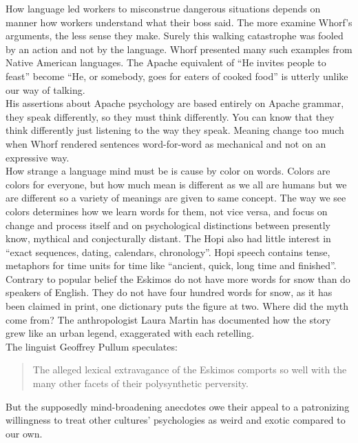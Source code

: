 \documentclass[13pt,letterpaper,onecolumn]{report}
\begin{document}
\hspace{1em}How language led workers to misconstrue dangerous situations depends on manner how workers understand what their boss said. The more examine Whorf’s arguments, the less sense they make. Surely this walking catastrophe was fooled by an action and not by the language. Whorf presented many such examples from Native American languages. The Apache equivalent of “He invites people to feast” become “He, or somebody, goes for eaters of cooked food” is utterly unlike our way of talking.\\
His assertions about Apache psychology are based entirely on Apache grammar, they speak differently, so they must think differently. You can know that they think differently just listening to the way they speak. Meaning change too much when Whorf rendered sentences word-for-word as mechanical and not on an expressive way.\\

\hspace{1em}How strange a language mind must be is cause by color on words. Colors are colors for everyone, but how much mean is different as we all are humans but we are different so a variety of meanings are given to same concept. The way we see colors determines how we learn words for them, not vice versa, and focus on change and process itself and on psychological distinctions between presently know, mythical and conjecturally distant. The Hopi also had little interest in “exact sequences, dating, calendars, chronology”. Hopi speech contains tense, metaphors for time units for time like “ancient, quick, long time and finished”. Contrary to popular belief the Eskimos do not have more words for snow than do speakers of English. They do not have four hundred words for snow, as it has been claimed in print, one dictionary puts the figure at two. Where did the myth come from? The anthropologist Laura Martin has documented how the story grew like an urban legend, exaggerated with each retelling.\\

\hspace{1em}The linguist Geoffrey Pullum speculates: 
\begin{quote}
The alleged lexical extravagance of the Eskimos comports so well with the many other facets of their polysynthetic perversity.
\end{quote}
But the supposedly mind-broadening anecdotes owe their appeal to a patronizing willingness to treat other cultures’ psychologies as weird and exotic compared to our own.\\
\end{document}

